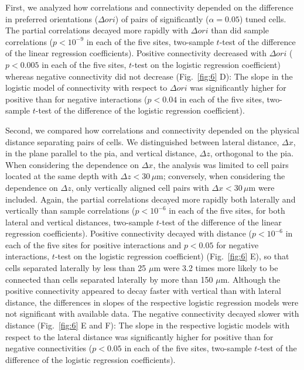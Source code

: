 First, we analyzed how correlations and connectivity depended on the difference in preferred orientations ($\Delta ori$) of pairs of significantly ($\alpha=0.05$) tuned cells. The partial correlations decayed more rapidly with $\Delta ori$ than did sample correlations ($p<10^{-9}$ in each of the five sites, two-sample $t$-test of the difference of the linear regression coefficients). Positive connectivity decreased with $\Delta ori$ ($p<0.005$ in each of the five sites, $t$-test on the logistic regression coefficient) whereas negative connectivity did not decrease (Fig.~\ref{fig:6} D): The slope in the logistic model of connectivity with respect to $\Delta ori$ was significantly higher for positive than for negative interactions ($p<0.04$ in each of the five sites, two-sample $t$-test of the difference of the logistic regression coefficient).

Second, we compared how correlations and connectivity depended on the physical distance separating pairs of cells. We distinguished between lateral distance, $\Delta x$, in the plane parallel to the pia, and vertical distance, $\Delta z$, orthogonal to the pia.  When considering the dependence on $\Delta x$, the analysis was limited to cell pairs located at the same depth with $\Delta z < 30\,\mu\mbox{m}$; conversely, when considering the dependence on $\Delta z$, only vertically aligned cell pairs with $\Delta x < 30\,\mu\mbox{m}$ were included. Again, the partial correlations decayed more rapidly both laterally and vertically than sample correlations ($p<10^{-6}$ in each of the five sites, for both lateral and vertical distances, two-sample $t$-test of the difference of the linear regression coefficients).
Positive connectivity decayed with distance ($p<10^{-6}$ in each of the five sites for positive interactions and $p<0.05$ for negative interactions, $t$-test on the logistic regression coefficient) (Fig.~\ref{fig:6} E), so that cells separated laterally by less than 25 $\mu\mbox{m}$ were 3.2 times more likely to be connected than cells separated laterally by more than 150 $\mu\mbox{m}$. Although the positive connectivity appeared to decay faster with vertical than with lateral distance, the differences in slopes of the respective logistic regression models were not significant with available data. The negative connectivity decayed slower with distance (Fig.~\ref{fig:6} E and F): The slope in the respective logistic models with respect to the lateral distance was significantly higher for positive than for negative connectivities ($p<0.05$ in each of the five sites, two-sample $t$-test of the difference of the logistic regression coefficients).

